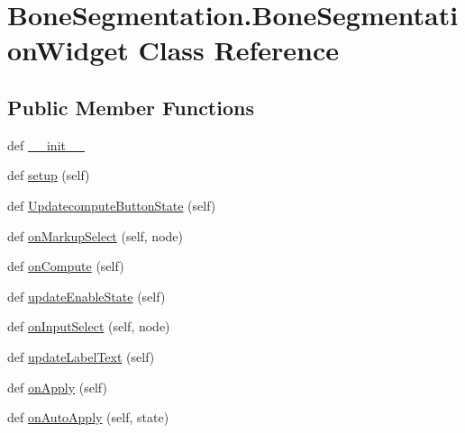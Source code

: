 \hypertarget{class_bone_segmentation_1_1_bone_segmentation_widget}{}\section{Bone\+Segmentation.\+Bone\+Segmentation\+Widget Class Reference}
\label{class_bone_segmentation_1_1_bone_segmentation_widget}
\subsection*{Public Member Functions}
\begin{DoxyCompactItemize}
\item 
def \hyperlink{class_bone_segmentation_1_1_bone_segmentation_widget_a7789bc11657d20776e7a8c1f38110e52}{\+\_\+\+\_\+init\+\_\+\+\_\+}
\item 
def \hyperlink{class_bone_segmentation_1_1_bone_segmentation_widget_a4e93b96c69533ee6b76f2320611d559b}{setup} (self)
\item 
def \hyperlink{class_bone_segmentation_1_1_bone_segmentation_widget_a59dd8c955d22afd6cd9a38e6df9886de}{Updatecompute\+Button\+State} (self)
\item 
def \hyperlink{class_bone_segmentation_1_1_bone_segmentation_widget_a9f29ad3fbd78af6166314c5b5bcfbc0b}{on\+Markup\+Select} (self, node)
\item 
def \hyperlink{class_bone_segmentation_1_1_bone_segmentation_widget_a04dff23cd18c96b1501fec0a4d5ff00b}{on\+Compute} (self)
\item 
def \hyperlink{class_bone_segmentation_1_1_bone_segmentation_widget_af5001bcf4f7f4287df81573394d01d03}{update\+Enable\+State} (self)
\item 
def \hyperlink{class_bone_segmentation_1_1_bone_segmentation_widget_a125125e3eae0dfd2724ab384457d1fc2}{on\+Input\+Select} (self, node)
\item 
def \hyperlink{class_bone_segmentation_1_1_bone_segmentation_widget_afa851eebd044552de0aaa8d887e0ab25}{update\+Label\+Text} (self)
\item 
def \hyperlink{class_bone_segmentation_1_1_bone_segmentation_widget_ad0da418d29939cb825a9bc616a883108}{on\+Apply} (self)
\item 
def \hyperlink{class_bone_segmentation_1_1_bone_segmentation_widget_aaa6cceaa3aa1d2a911480b02b1518563}{on\+Auto\+Apply} (self, state)
\end{DoxyCompactItemize}
